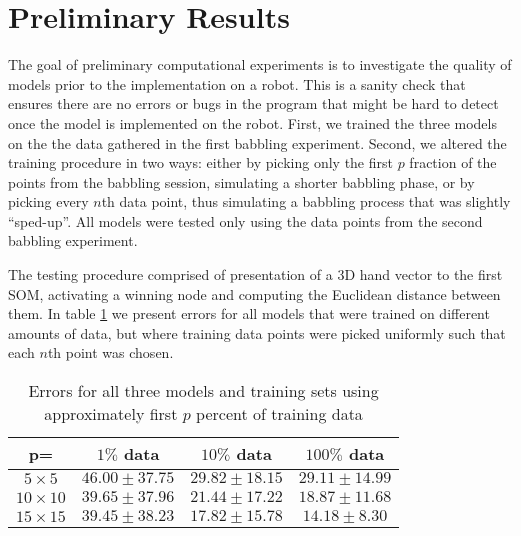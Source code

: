 

\section{Preliminary Results}
The goal of preliminary computational experiments is to investigate the quality of models prior to the implementation on a robot. This is a sanity check that ensures there are no errors or bugs in the program that might be hard to detect once the model is implemented on the robot.
First, we trained the three models on the the data gathered in the first babbling experiment. Second, we altered the training procedure in two ways: either by picking only the first $p$ fraction of the points from the babbling session, simulating a shorter babbling phase, or by picking every $n$th data point, thus simulating a babbling process that was slightly ``sped-up''. All models were tested only using the data points from the second babbling experiment.

The testing procedure comprised of presentation of a 3D hand vector to the first SOM, activating a winning node and computing the Euclidean distance between them. In table \ref{lab:table_trainf} we present errors for all models that were trained on different amounts of data, but where training data points were picked uniformly such that each $n$th point was chosen.

\renewcommand{\arraystretch}{1.5}
\begin{table}[t]\footnotesize
\begin{center} 
 \caption{Errors for all three models and training sets using approximately first $p$ percent of training data}
 \label{lab:table_trainf}
 \begin{tabular}{|c|c|c|c|}
   \hline     
    p= & $1\%$ data & $10\%$ data & $100\%$ data\\ \hline
   $5\times 5$ & $46.00 \pm 37.75$ & $29.82 \pm 18.15$ & $29.11 \pm 14.99$ \\ \hline
   $10\times 10$ & $39.65 \pm 37.96$ & $21.44 \pm 17.22$ & $18.87 \pm 11.68$ \\ \hline
   $15\times 15$ & $39.45 \pm 38.23$  & $17.82 \pm 15.78$ & $14.18\pm 8.30$ \\  
   \hline
 \end{tabular}
\end{center}
\end{table}

